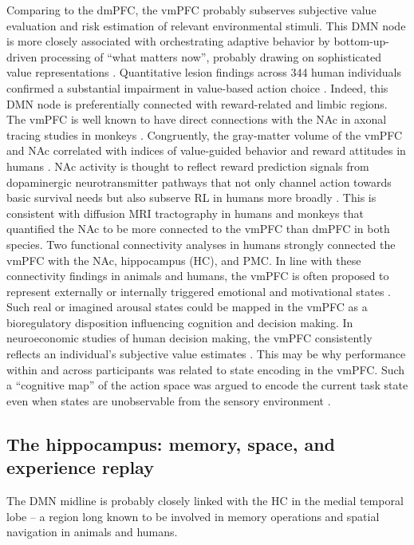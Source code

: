 \documentclass[10pt,letterpaper]{article}
\begin{document}
Comparing to the dmPFC,
the vmPFC probably subserves
subjective value evaluation and
risk estimation of relevant environmental stimuli.
This DMN node is more closely associated with
orchestrating adaptive behavior by bottom-up-driven
processing of “what matters now”,
probably drawing on sophisticated value representations
\citep{doherty2015structure}.
Quantitative lesion findings across 344 human individuals confirmed
a substantial impairment in value-based action choice
\citep{glascher2012lesion}.
Indeed,
this DMN node is preferentially connected with reward-related and limbic regions.
The vmPFC is well known to have direct connections
with the NAc
in axonal tracing studies in monkeys \citep{haber1995orbital}.
Congruently, the gray-matter volume of the vmPFC and NAc
correlated with indices of value-guided behavior and reward attitudes
in humans
\citep{lebreton2009automatic}.
NAc activity is thought to reflect reward prediction signals
from dopaminergic neurotransmitter pathways
\citep{schultz1998predictive}
that not only channel action towards basic survival needs but also
subserve RL in humans more broadly \citep{doherty2015structure}.
This is consistent with diffusion MRI tractography in humans and monkeys
\citep{croxson2005quantitative} that
quantified the NAc to
be more connected to the vmPFC than dmPFC in both species.
Two functional connectivity analyses in humans strongly connected
the vmPFC with the NAc, hippocampus (HC),
and PMC.
%
In line with these connectivity findings in animals and humans,
the vmPFC is often proposed to represent externally or internally triggered
emotional and motivational states \citep{damasio1996somatic}.
Such real or imagined arousal states could be mapped in the vmPFC
as a bioregulatory disposition influencing cognition
and decision making.
In neuroeconomic studies of human decision making,
the vmPFC consistently reflects an individual’s subjective
value estimates
\citep{behrens2008associative}.
This may be why performance within and across participants
was related to state encoding in the vmPFC.
Such a ``cognitive map'' of the action space was argued to encode
the current task state even when states are unobservable from the sensory environment
\citep{Schuck2016}.



\subsection{The hippocampus: memory, space, and experience replay}
The DMN midline is probably closely linked
with the HC in the medial temporal lobe \citep{vincet2006, shannon2013morning} --
a region long known to be involved in
memory operations and spatial navigation in animals and humans.
\end{document}
